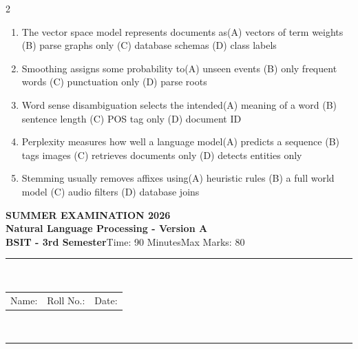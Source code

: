 \documentclass[a4paper]{article}
\makeatletter
\newcommand{\examheader}{%
\begin{center}\textbf{\large SUMMER EXAMINATION 2026}\\[-1pt]
\textbf{\normalsize Natural Language Processing - Version A}\\[-1pt]
\textbf{BSIT - 3rd Semester}\quad Time: 90 Minutes\quad Max Marks: 80\\[-1pt]
\textcolor{black!65}{\rule{\linewidth}{0.45pt}}\\[-2pt]
\begin{tabularx}{\linewidth}{@{}X X X@{}}Name: \hrulefill & Roll No.: \hrulefill & Date: \hrulefill\end{tabularx}\\[-1pt]
\textcolor{black!65}{\rule{\linewidth}{0.45pt}}\end{center}}
\makeatother
\begin{document}
\begin{multicols*}{2}
\begin{enumerate}
\item The vector space model represents documents as\newline\hspace*{0.6em}(A) vectors of term weights \quad (B) parse graphs only \newline\hspace*{0.6em}(C) database schemas \quad (D) class labels
\item Smoothing assigns some probability to\newline\hspace*{0.6em}(A) unseen events \quad (B) only frequent words \newline\hspace*{0.6em}(C) punctuation only \quad (D) parse roots
\item Word sense disambiguation selects the intended\newline\hspace*{0.6em}(A) meaning of a word \quad (B) sentence length \newline\hspace*{0.6em}(C) POS tag only \quad (D) document ID
\item Perplexity measures how well a language model\newline\hspace*{0.6em}(A) predicts a sequence \quad (B) tags images \newline\hspace*{0.6em}(C) retrieves documents only \quad (D) detects entities only
\item Stemming usually removes affixes using\newline\hspace*{0.6em}(A) heuristic rules \quad (B) a full world model \newline\hspace*{0.6em}(C) audio filters \quad (D) database joins
\end{enumerate}
\end{multicols*}
\newpage
\examheader
\raggedcolumns
\end{document}
